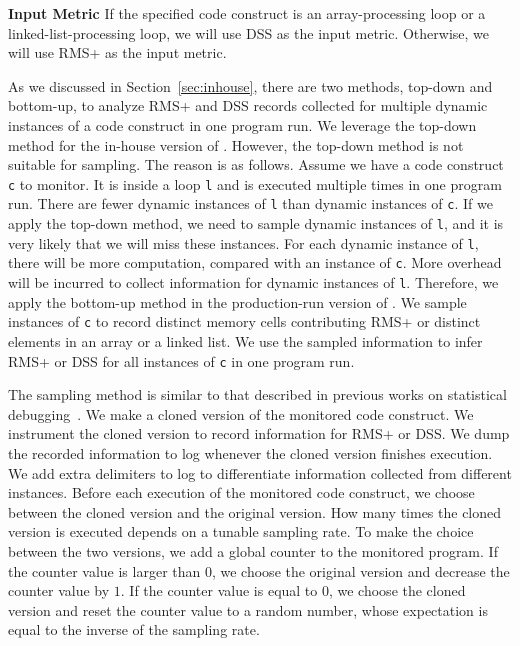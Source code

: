 \noindent\textbf{Input Metric}
If the specified code construct is an array-processing loop 
or a linked-list-processing loop,
we will use DSS as the input metric. 
Otherwise, we will use RMS+ as the input metric. 

As we discussed in Section~\ref{sec:inhouse}, 
there are two methods, top-down and bottom-up, 
to analyze RMS+ and DSS records collected 
for multiple dynamic instances of a code construct in one program run. 
We leverage the top-down method for the in-house version of \Tool. 
However, the top-down method is not suitable for sampling. 
The reason is as follows.
Assume we have a code construct \texttt{c} to monitor. 
It is inside a loop \texttt{l} and is executed multiple times in one program run.
There are fewer dynamic instances of \texttt{l}
than dynamic instances of \texttt{c}.
If we apply the top-down method, 
we need to sample dynamic instances of \texttt{l}, 
and it is very likely that we will miss these instances. 
For each dynamic instance of \texttt{l}, 
there will be more computation, 
compared with an instance of \texttt{c}.
More overhead will be incurred to collect 
information for dynamic instances of \texttt{l}.
Therefore, we apply the bottom-up method 
in the production-run version of \Tool.
We sample instances of \texttt{c} to record 
distinct memory cells contributing RMS+ 
or distinct elements in an array or a linked list.
We use the sampled information to infer RMS+ 
or DSS for all instances of \texttt{c} in one program run.


The sampling method is similar to that described in previous works on statistical 
debugging~\cite{liblit03,liblit05,CCI,SongOOPSLA2014,ldoctor}.
We make a cloned version of the monitored code construct.
We instrument the cloned version to record information for RMS+ or DSS. 
We dump the recorded information to log 
whenever the cloned version finishes execution. 
We add extra delimiters to log to differentiate information collected from different instances.
Before each execution of the monitored code construct, 
we choose between the cloned version and the original version. 
How many times the cloned version is executed 
depends on a tunable sampling rate. 
To make the choice between the two versions,
we add a global counter to the monitored program. 
If the counter value is larger than $0$, 
we choose the original version and decrease the counter value by $1$.
If the counter value is equal to $0$,
we choose the cloned version and reset the counter value to 
a random number, 
whose expectation is equal to the inverse of the sampling rate.  


